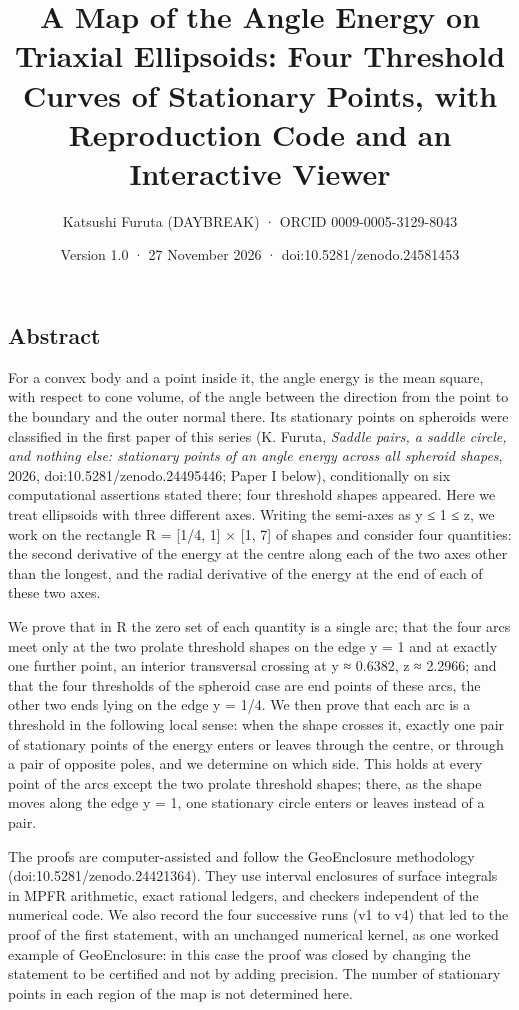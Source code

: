 \documentclass[
  11pt,
]{article}
\title{A Map of the Angle Energy on Triaxial Ellipsoids: Four Threshold
Curves of Stationary Points, with Reproduction Code and an Interactive
Viewer}
\author{Katsushi Furuta (DAYBREAK) · ORCID 0009-0005-3129-8043}
\date{Version 1.0 · 27 November 2026 · doi:10.5281/zenodo.24581453}
\begin{document}
\maketitle

{
\hypersetup{linkcolor=}
\setcounter{tocdepth}{2}
\tableofcontents
}
\subsection{Abstract}

For a convex body and a point inside it, the angle energy is the mean
square, with respect to cone volume, of the angle between the direction
from the point to the boundary and the outer normal there. Its
stationary points on spheroids were classified in the first paper of
this series (K. Furuta, \emph{Saddle pairs, a saddle circle, and nothing
else: stationary points of an angle energy across all spheroid shapes},
2026, doi:10.5281/zenodo.24495446; Paper I below), conditionally on six
computational assertions stated there; four threshold shapes appeared.
Here we treat ellipsoids with three different axes. Writing the
semi-axes as y ≤ 1 ≤ z, we work on the rectangle R = {[}1/4, 1{]} ×
{[}1, 7{]} of shapes and consider four quantities: the second derivative
of the energy at the centre along each of the two axes other than the
longest, and the radial derivative of the energy at the end of each of
these two axes.

We prove that in R the zero set of each quantity is a single arc; that
the four arcs meet only at the two prolate threshold shapes on the edge
y = 1 and at exactly one further point, an interior transversal crossing
at y ≈ 0.6382, z ≈ 2.2966; and that the four thresholds of the spheroid
case are end points of these arcs, the other two ends lying on the edge
y = 1/4. We then prove that each arc is a threshold in the following
local sense: when the shape crosses it, exactly one pair of stationary
points of the energy enters or leaves through the centre, or through a
pair of opposite poles, and we determine on which side. This holds at
every point of the arcs except the two prolate threshold shapes; there,
as the shape moves along the edge y = 1, one stationary circle enters or
leaves instead of a pair.

The proofs are computer-assisted and follow the GeoEnclosure methodology
(doi:10.5281/zenodo.24421364). They use interval enclosures of surface
integrals in MPFR arithmetic, exact rational ledgers, and checkers
independent of the numerical code. We also record the four successive
runs (v1 to v4) that led to the proof of the first statement, with an
unchanged numerical kernel, as one worked example of GeoEnclosure: in
this case the proof was closed by changing the statement to be certified
and not by adding precision. The number of stationary points in each
region of the map is not determined here.
\end{document}

